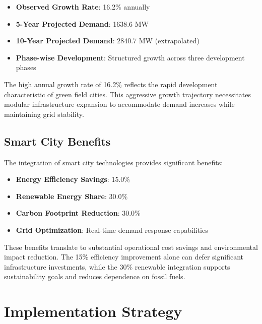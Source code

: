 \documentclass[12pt,a4paper]{article}
\begin{document}
\begin{itemize}
    \item \textbf{Observed Growth Rate}: 16.2\% annually
    \item \textbf{5-Year Projected Demand}: 1638.6 MW
    \item \textbf{10-Year Projected Demand}: 2840.7 MW (extrapolated)
    \item \textbf{Phase-wise Development}: Structured growth across three development phases
\end{itemize}

The high annual growth rate of 16.2\% reflects the rapid development characteristic of green field cities. This aggressive growth trajectory necessitates modular infrastructure expansion to accommodate demand increases while maintaining grid stability.

\subsection{Smart City Benefits}
The integration of smart city technologies provides significant benefits:

\begin{itemize}
    \item \textbf{Energy Efficiency Savings}: 15.0\%
    \item \textbf{Renewable Energy Share}: 30.0\%
    \item \textbf{Carbon Footprint Reduction}: 30.0\%
    \item \textbf{Grid Optimization}: Real-time demand response capabilities
\end{itemize}

These benefits translate to substantial operational cost savings and environmental impact reduction. The 15\% efficiency improvement alone can defer significant infrastructure investments, while the 30\% renewable integration supports sustainability goals and reduces dependence on fossil fuels.

\section{Implementation Strategy}
\end{document}
